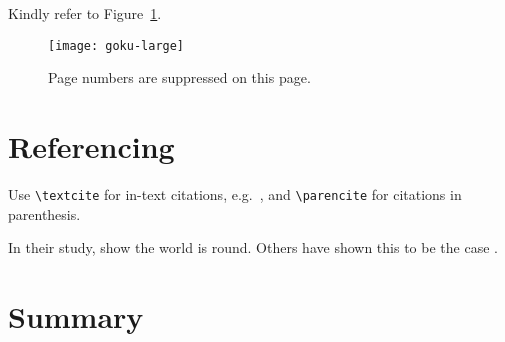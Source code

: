 Kindly refer to Figure~\ref{fig:largegoku}. 

\blindtext

\begin{figure}[!ht]
	\centering
	\texttt{[image: goku-large]}
	\caption[Short Random Caption]{Page numbers are suppressed on this page.}
	\label{fig:largegoku}
\end{figure}

\blindtext
\FloatBarrier %

\section{Referencing}

Use \texttt{\textbackslash textcite} for in-text citations, e.g.\ \textcite{Einstein1905}, and \texttt{\textbackslash parencite} for citations in parenthesis. 

In their study, \textcite{Einstein1905} show the world is round. Others have shown this to be the case \parencite{Arrighi2003, Ebejer2016}.

\section{Summary}
\blindtext[5]